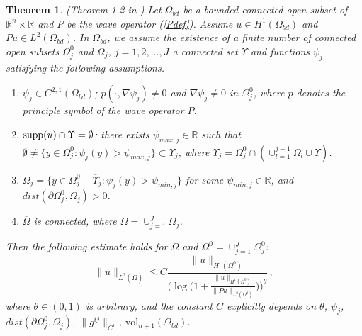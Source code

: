 \documentclass[11pt,letterpaper]{amsart}
\numberwithin{equation}{section}
\theoremstyle{definition}
\theoremstyle{plain}
\theoremstyle{definition}
\theoremstyle{plain}
\newtheorem{global1}[Def-CATradius]{Theorem}
\theoremstyle{definition}
\theoremstyle{plain}
\newcommand{\vol}{\textrm{vol}}
\begin{document}
\begin{global1}\label{global}(Theorem 1.2 in \cite{BKL2})
Let $\Omega_{bd}$ be a bounded connected open subset of $\mathbb{R}^n\times \mathbb{R}$ and $P$ be the wave operator (\ref{Pdef}). Assume $u\in H^1(\Omega_{bd})$ and $Pu\in L^2(\Omega_{bd})$. In $\Omega_{bd}$, we assume the existence of a finite number of connected open subsets $\Omega_{j}^0$ and $\Omega_{j}$, $j=1,2,\dots,J$ a connected set $\Upsilon$ and functions $\psi_j$ satisfying the following assumptions.
\begin{enumerate}[(1)]
\item $\psi_j\in C^{2,1}(\Omega_{bd})$; $p(\cdot,\nabla \psi_{j})\neq 0$ and $\nabla \psi_j\neq 0$ in $\Omega_{j}^0$, where $p$ denotes the principle symbol of the wave operator $P$.
\item ${\rm supp}(u)\cap \Upsilon=\emptyset$; there exists $\psi_{max,j}\in\mathbb{R}$ such that $\emptyset\neq\{y\in \Omega_{j}^0: \psi_j(y)> \psi_{max,j}\}\subset \overline{\Upsilon}_j$, where $\Upsilon_j=\Omega_{j}^0\cap(\cup_{l=1}^{j-1}\Omega_l\cup \Upsilon)$.
\item $\Omega_j=\{y\in \Omega_{j}^0-\overline{\Upsilon}_j: \psi_j(y) > \psi_{min,j}\}$ for some $\psi_{min,j}\in\mathbb{R}$, and $dist(\partial\Omega_{j}^0,\Omega_j)>0$.
\item $\overline{\Omega}$ is connected, where $\Omega=\cup_{j=1}^J \Omega_j$.
\end{enumerate}
Then the following estimate holds for $\Omega$ and $\Omega^0=\cup_{j=1}^J\Omega_{j}^0$:
$$\|u\|_{L^2(\overline{\Omega})}\leqslant C \frac{\|u\|_{H^1(\Omega^0)}}{\Big(\log\big(1+\frac{\|u\|_{H^1(\Omega^0)}}{\|Pu\|_{L^2(\Omega^0)}}\big)\Big)^{\theta}}\, ,$$
where $\theta\in(0,1)$ is arbitrary, and the constant $C$ explicitly depends on $\theta$, $\psi_j$, $ dist(\partial\Omega_{j}^0,\Omega_j)$, $\|g^{ij}\|_{C^1}$, $\vol_{n+1}(\Omega_{bd})$.
\end{global1}
\end{document}
